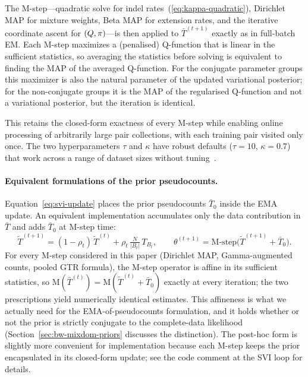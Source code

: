 The M-step---quadratic solve for indel rates~(\ref{eq:kappa-quadratic}),
Dirichlet MAP for mixture weights,
Beta MAP for extension rates,
and the iterative coordinate ascent for $(Q, \pi)$---is
then applied to $\bar{T}^{(t+1)}$ exactly as in full-batch EM.
Each M-step maximizes a (penalised) Q-function that is linear in the
sufficient statistics, so averaging the statistics before solving is
equivalent to finding the MAP of the averaged Q-function.
For the conjugate parameter groups this maximizer is also the natural
parameter of the updated variational posterior; for the non-conjugate
groups it is the MAP of the regularised Q-function and not a
variational posterior, but the iteration is identical.

This retains the closed-form exactness of every M-step
while enabling online processing of arbitrarily large pair collections,
with each training pair visited only once.
The two hyperparameters $\tau$ and $\kappa$ have robust defaults
($\tau = 10$, $\kappa = 0.7$) that work across a range of dataset sizes
without tuning~\cite{hoffman2013svi}.

\paragraph{Equivalent formulations of the prior pseudocounts.}
Equation~\eqref{eq:svi-update} places the prior pseudocounts $\bar T_0$
inside the EMA update. An equivalent implementation accumulates only
the data contribution in $\bar T$ and adds $\bar T_0$ at M-step time:
\[
\tilde T^{(t+1)} = (1-\rho_t)\,\tilde T^{(t)} + \rho_t\, \tfrac{N}{|B_t|}\, T_{B_t},
\qquad \theta^{(t+1)} = \mathrm{M\text{-}step}\bigl(\tilde T^{(t+1)} + \bar T_0\bigr).
\]
For every M-step considered in this paper (Dirichlet MAP,
Gamma-augmented counts, pooled GTR formula), the M-step operator is
affine in its sufficient statistics, so
$\mathrm{M}(\bar T^{(t)}) = \mathrm{M}(\tilde T^{(t)} + \bar T_0)$
exactly at every iteration; the two prescriptions yield numerically
identical estimates.
This affineness is what we actually need for the EMA-of-pseudocounts
formulation, and it holds whether or not the prior is strictly
conjugate to the complete-data likelihood
\ifdefined\MIXDOMPAPER(Section~\ref{sec:bw-mixdom-priors} discusses the distinction)\fi. The post-hoc form is slightly more convenient for
implementation because each M-step keeps the prior encapsulated in its
closed-form update; see the code comment at the SVI loop for details.

